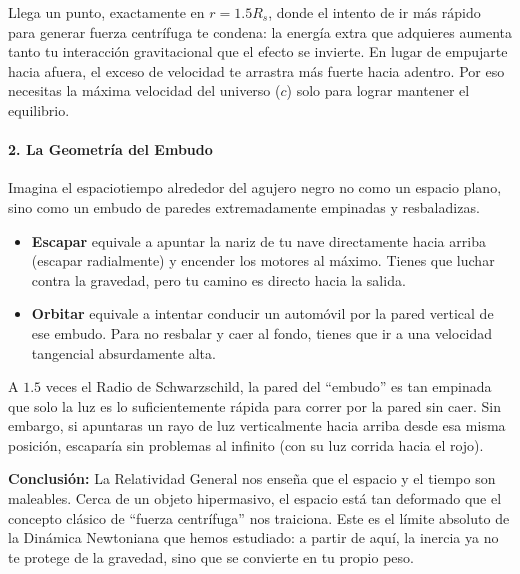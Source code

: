 \documentclass[12pt, a4paper]{article}
\begin{document}
\begin{solution}
Llega un punto, exactamente en $r = 1.5 R_s$, donde el intento de ir más rápido para generar fuerza centrífuga te condena: la energía extra que adquieres aumenta tanto tu interacción gravitacional que el efecto se invierte. En lugar de empujarte hacia afuera, el exceso de velocidad te arrastra más fuerte hacia adentro. Por eso necesitas la máxima velocidad del universo ($c$) solo para lograr mantener el equilibrio.

\paragraph{2. La Geometría del Embudo}
Imagina el espaciotiempo alrededor del agujero negro no como un espacio plano, sino como un embudo de paredes extremadamente empinadas y resbaladizas. 
\begin{itemize}
    \item \textbf{Escapar} equivale a apuntar la nariz de tu nave directamente hacia arriba (escapar radialmente) y encender los motores al máximo. Tienes que luchar contra la gravedad, pero tu camino es directo hacia la salida.
    \item \textbf{Orbitar} equivale a intentar conducir un automóvil por la pared vertical de ese embudo. Para no resbalar y caer al fondo, tienes que ir a una velocidad tangencial absurdamente alta. 
\end{itemize}

A $1.5$ veces el Radio de Schwarzschild, la pared del ``embudo'' es tan empinada que solo la luz es lo suficientemente rápida para correr por la pared sin caer. Sin embargo, si apuntaras un rayo de luz verticalmente hacia arriba desde esa misma posición, escaparía sin problemas al infinito (con su luz corrida hacia el rojo).

\textbf{Conclusión:}
La Relatividad General nos enseña que el espacio y el tiempo son maleables. Cerca de un objeto hipermasivo, el espacio está tan deformado que el concepto clásico de ``fuerza centrífuga'' nos traiciona. Este es el límite absoluto de la Dinámica Newtoniana que hemos estudiado: a partir de aquí, la inercia ya no te protege de la gravedad, sino que se convierte en tu propio peso.
\end{solution}
\end{document}
